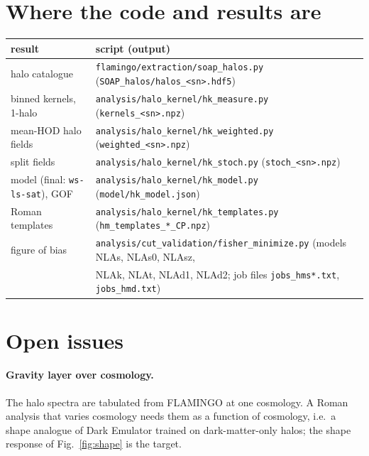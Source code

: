 \documentclass[11pt]{article}
\begin{document}
\section{Where the code and results are}

\begin{center}
\footnotesize
\setlength{\tabcolsep}{3pt}
\begin{tabular}{ll}
\toprule
result & script (output) \\
\midrule
halo catalogue & \texttt{flamingo/extraction/soap\_halos.py} (\texttt{SOAP\_halos/halos\_<sn>.hdf5}) \\
binned kernels, 1-halo & \texttt{analysis/halo\_kernel/hk\_measure.py} (\texttt{kernels\_<sn>.npz}) \\
mean-HOD halo fields & \texttt{analysis/halo\_kernel/hk\_weighted.py} (\texttt{weighted\_<sn>.npz}) \\
split fields & \texttt{analysis/halo\_kernel/hk\_stoch.py} (\texttt{stoch\_<sn>.npz}) \\
model (final: \texttt{ws-ls-sat}), GOF & \texttt{analysis/halo\_kernel/hk\_model.py} (\texttt{model/hk\_model.json}) \\
Roman templates & \texttt{analysis/halo\_kernel/hk\_templates.py} (\texttt{hm\_templates\_*\_CP.npz}) \\
figure of bias & \texttt{analysis/cut\_validation/fisher\_minimize.py} (models NLAs, NLAs0, NLAsz, \\
 & NLAk, NLAt, NLAd1, NLAd2; job files \texttt{jobs\_hms*.txt}, \texttt{jobs\_hmd.txt}) \\
\bottomrule
\end{tabular}
\end{center}

\section{Open issues}

\paragraph{Gravity layer over cosmology.} The halo spectra are tabulated
from FLAMINGO at one cosmology. A Roman analysis that varies cosmology
needs them as a function of cosmology, i.e.\ a shape analogue of Dark
Emulator trained on dark-matter-only halos; the shape response of
Fig.~\ref{fig:shape} is the target.
\end{document}
